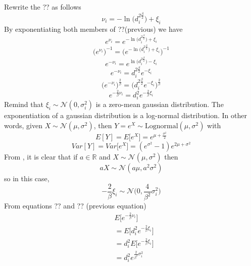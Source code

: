 \documentclass[12pt,twoside]{report}
\begin{document}
Rewrite the ?? as follows 
\begin{equation}
    \nu_i=-\ln\big(d_i^{2\frac{\beta}{2}}\big)+\xi_i
\end{equation}
By exponentiating both members of ??(previous) we have 
\begin{equation}
    e^{\nu_i}=e^{-\ln\big(d_i^{2\frac{\beta}{2}}\big)+\xi_i}
\end{equation}
\begin{equation}
    \bigg(e^{\nu_i}\bigg)^{-1}=\bigg(e^{-\ln\big(d_i^{2\frac{\beta}{2}}\big)+\xi_i}\bigg)^{-1}
\end{equation}
\begin{equation}
    e^{-\nu_i}=e^{\ln\big(d_i^{2\frac{\beta}{2}}\big)-\xi_i}
\end{equation}
\begin{equation}
    e^{-\nu_i}=d_i^{2\frac{\beta}{2}}e^{-\xi_i}
\end{equation}
\begin{equation}
    \bigg(e^{-\nu_i}\bigg)^{\frac{2}{\beta}}=\bigg(d_i^{2\frac{\beta}{2}}e^{-\xi_i}\bigg)^{\frac{2}{\beta}}
\end{equation}
\begin{equation}
    e^{-\frac{2}{\beta}\nu_i}=d_i^2e^{-\frac{2}{\beta}\xi_i}
\end{equation}
Remind that $\xi_i\sim \mathcal{N}(0,\sigma^2_i)$ is a zero-mean gaussian distribution. The exponentiation of a gaussian distribution is \cite{Beran2011} a log-normal distribution. In other words, given $X\sim \mathcal{N}(\mu,\sigma^2)$, then $Y=e^X\sim \text{Lognormal}(\mu,\sigma^2)$ with
\begin{equation}
    E[Y]=E\big[e^X\big]=e^{\mu+\frac{\sigma^2}{2}}
\end{equation}
\begin{equation}
    Var[Y]=Var\big[e^X\big]=(e^{\sigma^2}-1)e^{2\mu+\sigma^2}
\end{equation}
From \cite{alma9926534668905776}, it is clear that if $a\in \mathbb{R}$ and $X\sim \mathcal{N}(\mu,\sigma^2)$ then
\begin{equation}
aX\sim \mathcal{N}(a\mu,a^2\sigma^2)    
\end{equation}
so in this case, 
\begin{equation}
    -\frac{2}{\beta}\xi_i\sim \mathcal{N}\bigg(0,\frac{4}{\beta^2}\sigma^2_i\bigg)
\end{equation}
From equations ?? and ?? (previous equation)
\begin{align}
    &E\bigg[e^{-\frac{2}{\beta}\nu_i}\bigg]\\
    &=E\bigg[d_i^2e^{-\frac{2}{\beta}\xi_i}\bigg]\\
    &=d_i^2E\bigg[e^{-\frac{2}{\beta}\xi_i}\bigg]\\ &=d_i^2e^{\frac{2}{\beta^2}\sigma^2_i}
\end{align}
\end{document}
